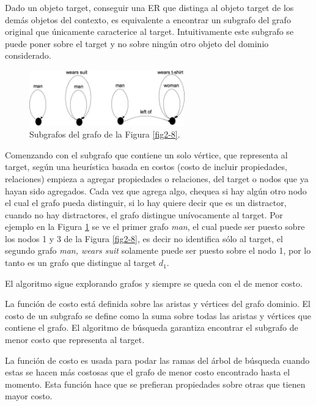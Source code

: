Dado un objeto target, conseguir una ER que distinga al objeto target de los dem\'as objetos del contexto, es equivalente a encontrar un subgrafo del grafo original que \'unicamente caracterice al target. Intuitivamente este subgrafo se puede poner sobre el target y no sobre ning\'un otro objeto del dominio considerado.

\begin{figure}[ht]
\centering
\includegraphics[width=0.6\textwidth]{images/ref-exp-graph.png}
\caption{Subgrafos del grafo de la Figura \ref{fig2-8}.}
\label{ref-exp-graph}
\end{figure}

Comenzando con el subgrafo que contiene un solo v\'ertice, que representa al target, seg\'un una heur\'{i}stica basada en costos (costo de incluir propiedades, relaciones) empieza a agregar propiedades o relaciones, del target o nodos que ya hayan sido agregados. Cada vez que agrega algo, chequea si hay alg\'un otro nodo el cual el grafo pueda distinguir, si lo hay quiere decir que es un distractor, cuando no hay distractores, el grafo distingue un\'ivocamente al target. Por ejemplo en la Figura \ref{ref-exp-graph} se ve el primer grafo {\it man}, el cual puede ser puesto sobre los nodos 1 y 3 de la Figura \ref{fig2-8}, es decir no identifica s\'olo al target, el segundo grafo {\it man, wears suit} solamente puede ser puesto sobre el nodo 1, por lo tanto es un grafo que distingue al target $d_1$.  

El algoritmo sigue explorando grafos y siempre se queda con el de menor costo.

La funci\'on de costo est\'a definida sobre las aristas y v\'ertices del grafo dominio. El costo de un subgrafo se define como la suma sobre todas las aristas y v\'ertices que contiene el grafo.
El algoritmo de b\'usqueda garantiza encontrar el subgrafo de menor costo que representa al target.

La funci\'on de costo es usada para podar las ramas del \'arbol de b\'usqueda cuando estas se hacen m\'as costosas que el grafo de menor costo encontrado hasta el momento. Esta funci\'on hace que se prefieran propiedades sobre otras que tienen mayor costo.

